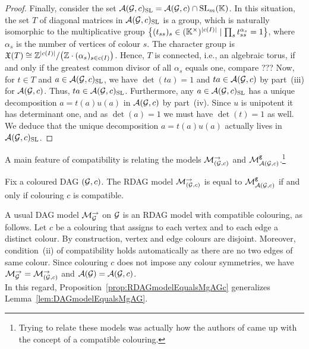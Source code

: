 \begin{proof}
	Finally, consider the set $\mathcal{A}(\mathcal{G}, c)_{\operatorname{SL}} = \mathcal{A}(\mathcal{G}, c) \cap \operatorname{SL}_m(\mathbb K)$. In this situation, the set $T$ of diagonal matrices in $\mathcal{A}(\mathcal{G}, c)_{\operatorname{SL}}$ is a group, which is naturally isomorphic to the multiplicative group $\big\{ (t_{ss})_s \in (\mathbb K^\times)^{|c(I)|} \mid \prod_s t_{ss}^{\alpha_s} = 1 \big\}$, where $\alpha_s$ is the number of vertices of colour $s$. The character group is $\mathfrak{X}(T) \cong \mathbb Z^{|c(I)|} / \big( \mathbb Z \cdot (\alpha_s)_{s \in c(I)} \big)$. Hence, $T$ is connected, i.e., an algebraic torus, if and only if the greatest common divisor of all $\alpha_s$ equals one, compare ??? %
	Now, for $t \in T$ and $a \in \mathcal{A}(\mathcal{G}, c)_{\operatorname{SL}}$, we have $\det(ta)=1$ and $ta \in \mathcal{A}(\mathcal{G}, c)$ by part~(iii) for $\mathcal{A}(\mathcal{G}, c)$. Thus, $ta \in \mathcal{A}(\mathcal{G}, c)_{\operatorname{SL}}$. Furthermore, any $a \in \mathcal{A}(\mathcal{G}, c)_{\operatorname{SL}}$ has a unique decomposition $a = t(a) u(a)$ in $\mathcal{A}(\mathcal{G}, c)$ by part~(iv). Since $u$ is unipotent it has determinant one, and as $\det(a)=1$ we must have $\det(t)=1$ as well. We deduce that the unique decomposition $a = t(a) u(a)$ actually lives in $\mathcal{A}(\mathcal{G}, c)_{\operatorname{SL}}$.
\end{proof}

A main feature of compatibility is relating the models $\mathcal{M}_{(\mathcal{G}, c)}^{\to}$ and $\mathcal{M}^{\mathtt{g}}_{\mathcal{A}(\mathcal{G}, c)}$.\footnote{Trying to relate these models was actually how the authors of \cite{RDAG} came up with the concept of a compatible colouring.}

\begin{prop}\label{prop:RDAGmodelEqualsMgAGc}
	Fix a coloured DAG $(\mathcal{G}, c)$. The RDAG model $\mathcal{M}_{(\mathcal{G}, c)}^{\to}$ is equal to $\mathcal{M}^{\mathtt{g}}_{\mathcal{A}(\mathcal{G}, c)}$ if and only if colouring $c$ is compatible.
\end{prop}

\begin{remark}\label{rem:DAGmodelViaCompatible}
	A usual DAG model $\mathcal{M}_{\mathcal{G}}^{\to}$ on $\mathcal{G}$ is an RDAG model with compatible colouring, as follows. Let $c$ be a colouring that assigns to each vertex and to each edge a distinct colour. By construction, vertex and edge colours are disjoint. Moreover, condition~(ii) of compatibility holds automatically as there are no two edges of same colour. Since colouring $c$ does not impose any colour symmetries, we have $\mathcal{M}_{\mathcal{G}}^{\to} = \mathcal{M}_{(\mathcal{G}, c)}^{\to}$ and $\mathcal{A}(\mathcal{G}) = \mathcal{A}(\mathcal{G}, c)$.\\
	In this regard, Proposition~\ref{prop:RDAGmodelEqualsMgAGc} generalizes Lemma~\ref{lem:DAGmodelEqualsMgAG}.
	\hfill\remSymbol
\end{remark}

